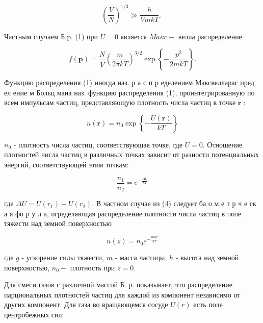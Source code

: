 \documentclass[10pt]{article}
\begin{document}
\[

\left(\frac{V}{N}\right)^{1 / 3} \gg \frac{h}{V m k T} \text {. }

\]



Частным случаем Б.p. (1) при $U=0$ является $M a \kappa c-$ велла распределение



\[

f(\boldsymbol{p})=\frac{N}{\bar{V}}\left(\frac{m}{2 \pi k T}\right)^{3 / 2} \exp \left\{-\frac{p^{2}}{2 m k T}\right\} .

\]



Функцию распределения (1) иногда наз. р а с п р еделением Максвелларас пред ел ение м Больц мана наз. функцию распределения (1), проинтегрированную по всем импульсам частиц, представляющую плотность числа частиц в точке $\boldsymbol{r}$ :



\[

n(\boldsymbol{r})=n_{0} \exp \left\{-\frac{U(\boldsymbol{r})}{k T}\right\}

\]



$n_{0}$ - плотность числа частиц, соответствующая точке, где $U=0$. Отношение плотностей числа частиц в различных точках зависит от разности потенциальных энергий, соответствующей этим точкам:



\[

\frac{n_{1}}{n_{2}}=e^{-\frac{\Delta U}{k T}}

\]



где $\Delta U=U\left(r_{1}\right)-U\left(r_{2}\right)$. В частном случае из (4) следует ба о м е т р ч е ск а я фо р у л а, огределяющая распределение плотности числа частиц в поле тяжести над земной поверхностью



\[

n(z)=n_{0} e^{-\frac{m g z}{k T}}

\]



где $g$ - ускорение силы тяжести, $m$ - масса частицы, $h$ - высота над земной поверхностью, $n_{0}-$ плотность при $z=0$.



Для смеси газов с различной массой Б. р. показывает, что распределение парциональных плотностей частиц для каждой из компонент независимо от других компонент. Для газа во вращающемся сосуде $U(r)$ есть поле центробежных сил:
\end{document}
